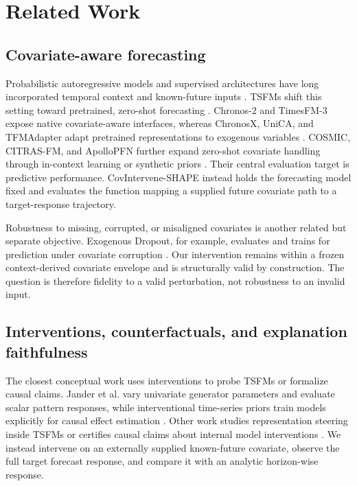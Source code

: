 \documentclass[conference]{IEEEtran}
\begin{document}
\section{Related Work}
\subsection{Covariate-aware forecasting}

Probabilistic autoregressive models and supervised architectures have long incorporated
temporal context and known-future inputs \cite{salinas2020deepar,lim2021tft}. TSFMs
shift this setting toward pretrained, zero-shot forecasting
\cite{ansari2024chronos,das2024timesfm}. Chronos-2 and TimesFM-3 expose native
covariate-aware interfaces, whereas ChronosX, UniCA, and TFMAdapter adapt pretrained
representations to exogenous variables \cite{ansari2025chronos2,jain2026timesfm3,
arango2025chronosx,han2025unica,dange2025tfmadapter}. COSMIC, CITRAS-FM, and ApolloPFN
further expand zero-shot covariate handling through in-context learning or synthetic
priors \cite{auer2025cosmic,yamaguchi2026citrasfm,potapczynski2026apollopfn}. Their
central evaluation target is predictive performance. CovIntervene-SHAPE instead holds
the forecasting model fixed and evaluates the function mapping a supplied future
covariate path to a target-response trajectory.

Robustness to missing, corrupted, or misaligned covariates is another related but
separate objective. Exogenous Dropout, for example, evaluates and trains for prediction
under covariate corruption \cite{hu2026exogenousdropout}. Our intervention remains
within a frozen context-derived covariate envelope and is structurally valid by
construction. The question is therefore fidelity to a valid perturbation, not
robustness to an invalid input.

\subsection{Interventions, counterfactuals, and explanation faithfulness}

The closest conceptual work uses interventions to probe TSFMs or formalize causal
claims. Jander et al. vary univariate generator parameters and evaluate scalar pattern
responses, while interventional time-series priors train models explicitly for causal
effect estimation \cite{jander2026causalanalysis,thumm2026causaltimeprior}. Other work
studies representation steering inside TSFMs or certifies causal claims about internal
model interventions \cite{wilinski2025representations,asiaee2026certified}. We instead
intervene on an externally supplied known-future covariate, observe the full target
forecast response, and compare it with an analytic horizon-wise response.
\end{document}
